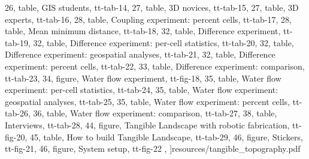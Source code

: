\documentclass[11pt,          %
               phd,           %
               onehalfspacing %
               ]{ncsuthesis}
\begin{document}
{	26, table, {GIS students}, tt-tab-14,
	27, table, {3D novices}, tt-tab-15,
	27, table, {3D experts}, tt-tab-16,
	28, table, {Coupling experiment: percent cells}, tt-tab-17,
	28, table, {Mean minimum distance}, tt-tab-18,
	32, table, Difference experiment, tt-tab-19,
	32, table, {Difference experiment: per-cell statistics}, tt-tab-20,
	32, table, {Difference experiment: geospatial analyses}, tt-tab-21,
	32, table, {Difference experiment: percent cells}, tt-tab-22,
	33, table, {Difference experiment: comparison}, tt-tab-23,
	34, figure, Water flow experiment, tt-fig-18,
	35, table, {Water flow experiment: per-cell statistics}, tt-tab-24,
	35, table, {Water flow experiment: geospatial analyses}, tt-tab-25,
	35, table, {Water flow experiment: percent cells}, tt-tab-26,
	36, table, {Water flow experiment: comparison}, tt-tab-27,
	38, table, {Interviews}, tt-tab-28,
	44, figure, {Tangible Landscape with robotic fabrication}, tt-fig-20,
	45, table, {How to build Tangible Landscape}, tt-tab-29,
	46, figure, {Stickers}, tt-fig-21,
	46, figure, {System setup}, tt-fig-22
	},
]{resources/tangible_topography.pdf}
\end{document}
